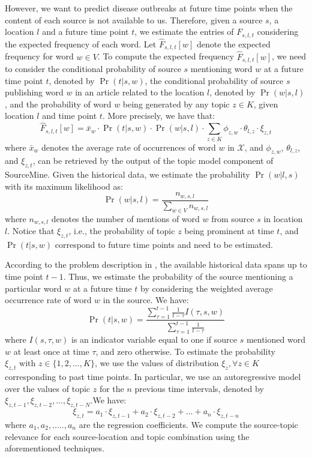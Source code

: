 \documentclass[conference]{IEEEtran}
\newcommand{\fullmodel}{{{\sf SourceMine}}\xspace}
\begin{document}
However, we want to predict disease outbreaks at future time points when the content of each source is not available to us. Therefore, given a source $s$, a location $l$ and a future time point $t$, we estimate the entries of $F_{s,l,t}$ considering the expected frequency of each word. Let $\hat{F}_{s,l,t}[w]$ denote the expected frequency for word 
$w \in V$. To compute the expected frequency $\hat{F}_{s,l,t}[w]$, we need to consider the conditional probability of source $s$ mentioning word $w$ at a future time point $t$, denoted by $\Pr(t|s,w)$, the conditional probability of source $s$ publishing word $w$ in an article related to the location $l$, denoted by $\Pr(w|s,l)$, and 
the probability of word $w$ being generated by any topic $z \in K$, given location $l$ and time point $t$. 
More precisely, we have that:
\begin{equation}
  \hat{F}_{s,l,t}[w] = \bar{x}_{w} \cdot \Pr(t|s,w) \cdot \Pr(w|s,l)\cdot \sum_{z \in K}\phi_{z,w}\cdot \theta_{l,z} \cdot \xi_{z,t}
\end{equation}
where $\bar{x}_{w}$ denotes the average rate of occurrences of word $w$ in $\mathcal{X}$,  and 
$\phi_{z,w}$, $\theta_{l,z}$, and $\xi_{z,t}$, can be retrieved by the output of the topic model component of \fullmodel.  Given the historical data, we estimate the probability $\Pr(w|l,s)$ with its maximum likelihood as:
\begin{equation}
  \Pr(w|s,l) = \frac{n_{w,s,l}}{\sum_{w\in V}n_{w,s,l}}
\end{equation}
where $n_{w,s,l}$ denotes the number of mentions of word $w$ from source $s$ in location $l$.
Notice that $\xi_{z,t}$, i.e., the probability of topic $z$ being prominent at time $t$, 
and $\Pr(t|s,w)$ correspond to future time points and need to be estimated.  

According to the problem description in , the available historical 
data spans up to time point $t-1$. Thus, we estimate the probability of the source 
mentioning a particular word $w$ at a future time $t$ by considering the weighted average occurrence rate of word $w$ in the source. We have:
\begin{equation}
\Pr(t|s,w) = \frac{\sum_{\tau = 1}^{t-1} \frac{1}{t - \tau}I(\tau,s,w)}{\sum_{\tau = 1}^{t-1} \frac{1}{t - \tau}}
\label{eq:prob_time}
\end{equation}
where $I(s,\tau,w)$ is an indicator variable equal to one if source $s$ mentioned word $w$ at least once at time $\tau$, and zero otherwise. 
To estimate the probability $\xi_{z,t} \mbox{ with } z \in \{1, 2, \dots, K\}$, 
we use the values of distribution $\xi_{z}, \forall z \in K$ corresponding to past time points. In particular, we use an autoregressive model over the values of topic $z$ for the $n$ previous time intervals, denoted by $\xi_{z,t-1},\xi_{z,t-2},\dots,\xi_{z,t-N}$.We have:
\begin{equation}
\xi_{z,t}=a_1 \cdot \xi_{z,t-1}+a_2\cdot \xi_{z,t-2}+\dots +a_n\cdot \xi_{z,t-n}
\end{equation}
where $a_1,a_2,.....,a_n$ are the regression coefficients.  We compute the source-topic relevance for each source-location and topic combination using the aforementioned techniques.
\end{document}
